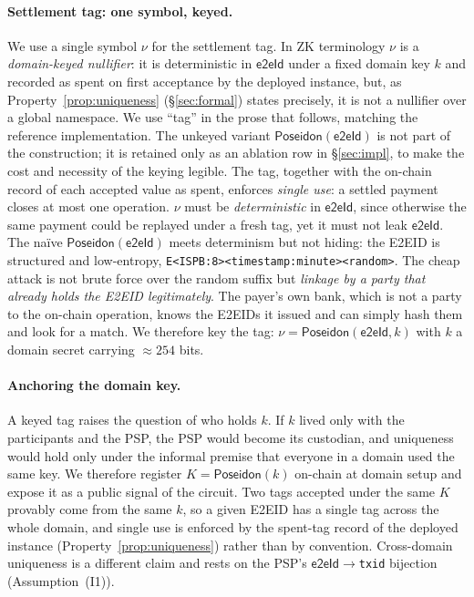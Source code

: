 \documentclass[11pt]{article}
\newcommand{\Poseidon}{\ensuremath{\mathsf{Poseidon}}}
\newcommand{\eeid}{\ensuremath{\mathsf{e2eId}}}
\newcommand{\code}[1]{\texttt{#1}}
\begin{document}
\paragraph{Settlement tag: one symbol, keyed.}
We use a single symbol $\nu$ for the settlement tag. In ZK terminology $\nu$ is a
\emph{domain-keyed nullifier}: it is deterministic in \eeid{} under a fixed
domain key $k$ and recorded as spent on first acceptance by the deployed
instance, but, as Property~\ref{prop:uniqueness} (\S\ref{sec:formal}) states
precisely, it is not a nullifier over a global namespace. We use ``tag'' in the
prose that follows, matching the reference implementation. The unkeyed variant
$\Poseidon(\eeid)$ is not part of the construction; it is retained only as an
ablation row in \S\ref{sec:impl}, to make the cost and necessity of the keying
legible. The tag, together with the on-chain record of each accepted value as
spent, enforces \emph{single use}: a settled payment closes at most one
operation. $\nu$ must be \emph{deterministic} in \eeid{}, since otherwise the
same payment could be replayed under a fresh tag, yet it must not leak \eeid.
The na\"ive $\Poseidon(\eeid)$ meets determinism but not hiding: the E2EID is
structured and low-entropy, \code{E<ISPB:8><timestamp:minute><random>}. The
cheap attack is not brute force over the random suffix but \emph{linkage by a
party that already holds the E2EID legitimately}. The payer's own bank, which is
not a party to the on-chain operation, knows the E2EIDs it issued and can simply
hash them and look for a match. We therefore key the tag: $\nu=\Poseidon(\eeid,
k)$ with $k$ a domain secret carrying $\approx 254$ bits.

\paragraph{Anchoring the domain key.}
A keyed tag raises the question of who holds $k$. If $k$ lived only with the
participants and the PSP, the PSP would become its custodian, and uniqueness
would hold only under the informal premise that everyone in a domain used the
same key. We therefore register $K=\Poseidon(k)$ on-chain at domain setup and
expose it as a public signal of the circuit. Two tags accepted under the same
$K$ provably come from the same $k$, so a given E2EID has a single tag across
the whole domain, and single use is enforced by the spent-tag record of the
deployed instance (Property~\ref{prop:uniqueness}) rather than by convention.
Cross-domain uniqueness is a different claim and rests on the PSP's
\eeid{}$\to$\code{txid} bijection (Assumption~(I1)).
\end{document}
